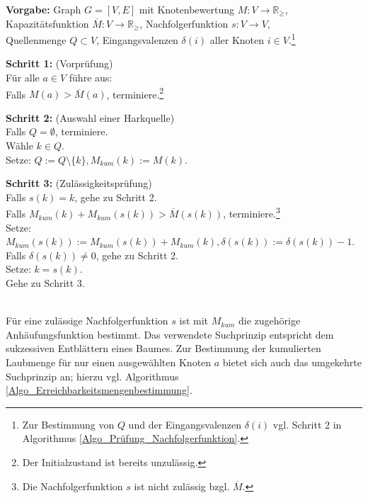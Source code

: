 \begin{algo}
\label{Algo_Zulässigkeitsprüfung}
\textbf{Vorgabe:} Graph $G=[V,E]$ mit Knotenbewertung $M:V \rightarrow \mathbb{R}_\geq$,\\ Kapazitätsfunktion $\overline{M}:V \rightarrow \mathbb{R}_\geq$, Nachfolgerfunktion $s:V \rightarrow V$, \\Quellenmenge $Q \subset V$, Eingangsvalenzen $\delta(i)$ aller Knoten $i \in V$.\footnote{Zur Bestimmung von $Q$ und der Eingangsvalenzen $\delta(i)$ vgl. Schritt 2 in Algorithmus \ref{Algo_Prüfung_Nachfolgerfunktion}.}

\noindent 
\textbf{Schritt 1:} (Vorprüfung)\\
\phantom \quad Für alle $a \in V$ führe aus:\\
\phantom \quad \qquad Falls $M(a) > \overline{M}(a)$, terminiere.\footnote{Der Initialzustand ist bereits unzulässig.}

\noindent 
\textbf{Schritt 2:} (Auswahl einer Harkquelle)\\
\phantom \quad Falls $Q = \emptyset$, terminiere.\\
\phantom \quad Wähle $k \in Q$.\\
\phantom \quad Setze: $Q := Q \setminus \{k\}, M_{kum}(k) := M(k)$.

\noindent 
\textbf{Schritt 3:} (Zulässigkeitsprüfung)\\
\phantom \quad Falls $s(k) = k$, gehe zu Schritt 2.\\
\phantom \quad Falls $M_{kum}(k) + M_{kum}(s(k)) > \overline{M}(s(k))$, terminiere.\footnote{Die Nachfolgerfunktion $s$ ist nicht zulässig bzgl. $\overline{M}$.}\\
\phantom \quad Setze: $M_{kum}(s(k)) := M_{kum}(s(k)) + M_{kum}(k) , \delta(s(k)) := \delta(s(k)) -1$.\\
\phantom \quad Falls $\delta(s(k)) \neq 0$, gehe zu Schritt 2.\\
\phantom \quad Setze: $k = s(k)$.\\
\phantom \quad Gehe zu Schritt 3.
\end{algo}

\phantom \\
\noindent Für eine zulässige Nachfolgerfunktion $s$ ist mit $M_{kum}$ die zugehörige Anhäufungsfunktion bestimmt. Das verwendete Suchprinzip entspricht dem sukzessiven Entblättern eines Baumes. Zur Bestimmung der kumulierten Laubmenge für nur einen ausgewählten Knoten $a$ bietet sich auch das umgekehrte Suchprinzip an; hierzu vgl. Algorithmus \ref{Algo_Erreichbarkeitsmengenbestimmung}. \\


